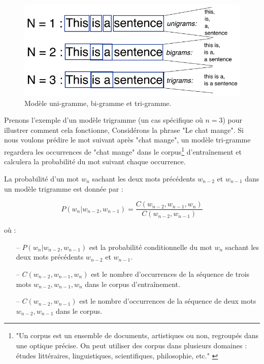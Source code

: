 \begin{figure}[H]
    \centering
    \includegraphics[width=12cm]{gfx/fig-n-gram.png}
    \caption{Modèle uni-gramme, bi-gramme et tri-gramme. \cite{Agarwal}}
    \label{fig:n-gram}
\end{figure}

Prenons l'exemple d'un modèle trigramme (un cas spécifique où $n = 3$) pour illustrer comment cela fonctionne, Considérons la phrase "Le chat mange". Si nous voulons prédire le mot suivant après "chat mange", un modèle tri-gramme regardera les occurrences de "chat mange" dans le corpus\footnote{"Un corpus est un ensemble de documents, artistiques ou non, regroupés dans une optique précise. On peut utiliser des corpus dans plusieurs domaines : études littéraires, linguistiques, scientifiques, philosophie, etc." \cite{frwiki:205358830}} d'entraînement et calculera la probabilité du mot suivant chaque occurrence.

La probabilité d'un mot \(w_n\) sachant les deux mots précédents \(w_{n-2}\) et \(w_{n-1}\) dans un modèle trigramme est donnée par : 

\begin{equation}
    P(w_n | w_{n-2}, w_{n-1}) = \frac{C(w_{n-2}, w_{n-1}, w_n)}{C(w_{n-2}, w_{n-1})}
\end{equation}

où :
\begin{itemize}
    \item[--] \(P(w_n | w_{n-2}, w_{n-1})\) est la probabilité conditionnelle du mot \(w_n\) sachant les deux mots précédents \(w_{n-2}\) et \(w_{n-1}\).
    \item[--] \(C(w_{n-2}, w_{n-1}, w_n)\) est le nombre d'occurrences de la séquence de trois mots \(w_{n-2}, w_{n-1}, w_n\) dans le corpus d'entraînement.
    \item[--] \(C(w_{n-2}, w_{n-1})\) est le nombre d'occurrences de la séquence de deux mots \(w_{n-2}, w_{n-1}\) dans le corpus.
\end{itemize}

